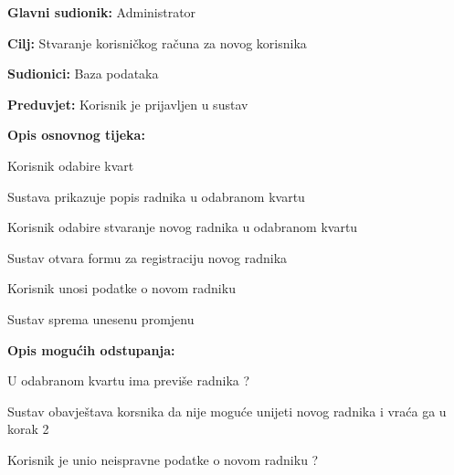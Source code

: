 				
				\noindent {}
					\begin{packed_item}
	
						\item \textbf{Glavni sudionik: }Administrator
						\item  \textbf{Cilj:} Stvaranje korisničkog računa za novog korisnika
						\item  \textbf{Sudionici:} Baza podataka
						\item  \textbf{Preduvjet:} Korisnik je prijavljen u sustav
						\item  \textbf{Opis osnovnog tijeka:}
						
						\item[] \begin{packed_enum}
	
							\item Korisnik odabire kvart
							\item Sustava prikazuje popis radnika u odabranom kvartu
							\item Korisnik odabire stvaranje novog radnika u odabranom kvartu
							\item Sustav otvara formu za registraciju novog radnika
							\item Korisnik unosi podatke o novom radniku
							\item Sustav sprema unesenu promjenu
						\end{packed_enum}
						
						\item  \textbf{Opis mogućih odstupanja:}
						
						\item[] \begin{packed_item}
	
							\item[3.a] U odabranom kvartu ima previše radnika ?
							
							\item[] \begin{packed_enum}
								
								\item Sustav obavještava korsnika da nije moguće unijeti novog radnika i vraća ga u korak 2
								
							\end{packed_enum}
							\item[5. a] Korisnik je unio neispravne podatke o novom radniku ?
							
								\item[] \begin{packed_enum}
								

\end{packed_enum}
\end{packed_item}
\end{packed_item}
